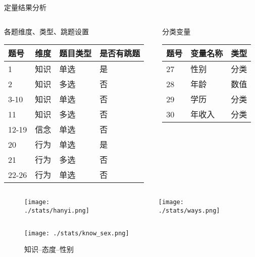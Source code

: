\begin{frame}[allowframebreaks]{定量结果分析}
\begin{columns}
\begin{column}{0.7\textwidth}
    \begin{block}{各题维度、类型、跳题设置}
\begin{longtable}[]{@{}llll@{}}
    
    题号 & 维度 & 题目类型 & 是否有跳题\tabularnewline
    \hline
    \endhead
    1 & 知识 & 单选 & 是\tabularnewline
    2 & 知识 & 多选 & 否\tabularnewline
    3-10 & 知识 & 单选 & 否\tabularnewline
    11 & 知识 & 多选 & 否\tabularnewline
    12-19 & 信念 & 单选 & 否\tabularnewline
    20 & 行为 & 单选 & 是\tabularnewline
    21 & 行为 & 多选 & 否\tabularnewline
    22-26 & 行为 & 单选 & 否\tabularnewline
    \hline
\end{longtable}
\end{block}
\end{column}
\begin{column}{0.6\textwidth}
\begin{block}{分类变量}
\begin{longtable}[]{@{}lll@{}}
    
    题号 & 变量名称 & 类型\tabularnewline
    \hline
    \endhead
    27 & 性别 & 分类\tabularnewline
    28 & 年龄 & 数值\tabularnewline
    29 & 学历 & 分类\tabularnewline
    30 & 年收入 & 分类\tabularnewline
    \hline
\end{longtable}
\end{block}
\end{column}
\end{columns}
    \begin{columns}
    \begin{column}{0.6\textwidth}
\begin{figure}[h]
    \texttt{[image: ./stats/hanyi.png]}
\end{figure}
    \end{column}
    \begin{column}{0.6\textwidth}
        \begin{figure}[h]
            \texttt{[image: ./stats/ways.png]}
        \end{figure} 
    \end{column}
\end{columns}

    \begin{columns}
    \begin{column}{0.5\textwidth}
        \begin{figure}[h]
            \caption{知识--态度--性别}
            \texttt{[image: ./stats/know\_sex.png]}
            

\end{figure}
\end{column}
\end{columns}
\end{frame}
